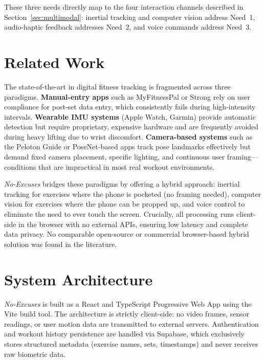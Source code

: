 \documentclass[11pt]{article}
\begin{document}
These three needs directly map to the four interaction channels described in Section~\ref{sec:multimodal}: inertial tracking and computer vision address Need~1, audio-haptic feedback addresses Need~2, and voice commands address Need~3.

\section{Related Work}

The state-of-the-art in digital fitness tracking is fragmented across three paradigms. \textbf{Manual-entry apps} such as MyFitnessPal or Strong rely on user compliance for post-set data entry, which consistently fails during high-intensity intervals. \textbf{Wearable IMU systems} (Apple Watch, Garmin) provide automatic detection but require proprietary, expensive hardware and are frequently avoided during heavy lifting due to wrist discomfort. \textbf{Camera-based systems} such as the Peloton Guide or PoseNet-based apps track pose landmarks effectively but demand fixed camera placement, specific lighting, and continuous user framing—conditions that are impractical in most real workout environments.

\textit{No-Excuses} bridges these paradigms by offering a hybrid approach: inertial tracking for exercises where the phone is pocketed (no framing needed), computer vision for exercises where the phone can be propped up, and voice control to eliminate the need to ever touch the screen. Crucially, all processing runs client-side in the browser with no external APIs, ensuring low latency and complete data privacy. No comparable open-source or commercial browser-based hybrid solution was found in the literature.

\section{System Architecture}

\textit{No-Excuses} is built as a React and TypeScript Progressive Web App using the Vite build tool. The architecture is strictly client-side: no video frames, sensor readings, or user motion data are transmitted to external servers. Authentication and workout history persistence are handled via Supabase, which exclusively stores structured metadata (exercise names, sets, timestamps) and never receives raw biometric data.
\end{document}
